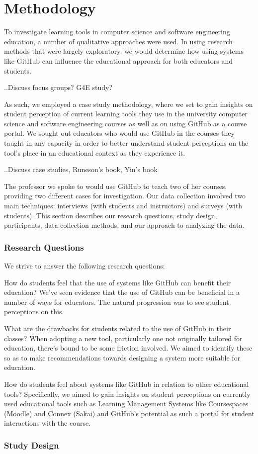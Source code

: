 \chapter{Methodology}

To investigate learning tools in computer science and software engineering education, a number of qualitative approaches were used. In using research methods that were largely exploratory, we would determine how using systems like GitHub can influence the educational approach for both educators and students.

..Discuss focus groups? G4E study?

As such, we employed a case study methodology, where we set to gain insights on student perception of current learning tools they use in the university computer science and software engineering courses as well as on using GitHub as a course portal. We sought out educators who would use GitHub in the courses they taught in any capacity in order to better understand student perceptions on the tool's place in an educational context as they experience it.

..Discuss case studies, Runeson's book, Yin's book

The professor we spoke to would use GitHub to teach two of her courses, providing two different cases for investigation. Our data collection involved two main techniques: interviews (with students and instructors) and surveys (with students). This section describes our research questions, study design, participants, data collection methods, and our approach to analyzing the data.

\subsection{Research Questions}
We strive to answer the following research questions:

\bigskip
How do students feel that the use of systems like GitHub can benefit their education? We've seen evidence that the use of GitHub can be beneficial in a number of ways for educators. The natural progression was to see student perceptions on this.

\bigskip
What are the drawbacks for students related to the use of GitHub in their classes? When adopting a new tool, particularly one not originally tailored for education, there's bound to be some friction involved. We aimed to identify these so as to make recommendations towards designing a system more suitable for education.

\bigskip
How do students feel about systems like GitHub in relation to other educational tools? Specifically, we aimed to gain insights on student perceptions on currently used educational tools such as Learning Management Systems like Coursespaces (Moodle) and Connex (Sakai) and GitHub's potential as such a portal for student interactions with the course.

\subsection{Study Design}
